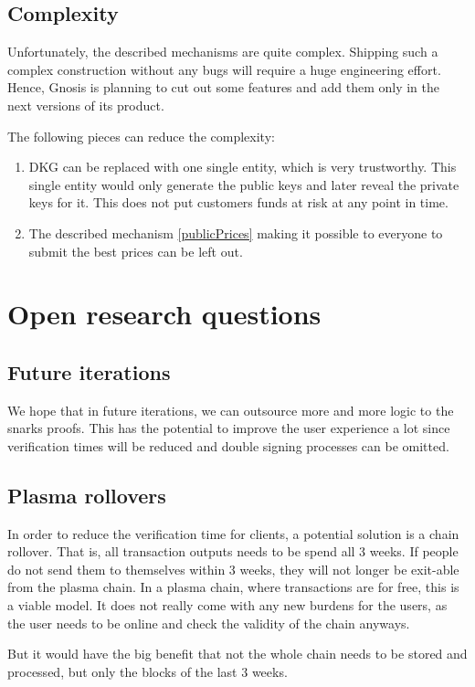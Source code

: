 \documentclass[11pt,parskip=full]{scrartcl}%
\begin{document}
\subsection{Complexity}
Unfortunately, the described mechanisms are quite complex. 
Shipping such a complex construction without any bugs will require a huge engineering effort. 
Hence, Gnosis is planning to cut out some features and add them only in the next versions of its product. 

The following pieces can reduce the complexity:
\begin{enumerate}
\item
DKG can be replaced with one single entity, which is very trustworthy. 
This single entity would only generate the public keys and later reveal the private keys for it. 
This does not put customers funds at risk at any point in time. 
\item
The described mechanism \ref{publicPrices} making it possible to everyone to submit the best prices can be left out. 
\end{enumerate}

\section{Open research questions}

\subsection{Future iterations}
We hope that in future iterations, we can outsource more and more logic to the snarks proofs. 
This has the potential to improve the user experience a lot since verification times will be reduced and double signing processes can be omitted. 

\subsection{Plasma rollovers}
In order to reduce the verification time for clients, a potential solution is a chain rollover. 
That is, all transaction outputs needs to be spend all 3 weeks. 
If people do not send them to themselves within 3 weeks, they will not longer be exit-able from the plasma chain. 
In a plasma chain, where transactions are for free, this is a viable model. 
It does not really come with any new burdens for the users, as the user needs to be online and check the validity of the chain anyways.

But it would have the big benefit that not the whole chain needs to be stored and processed, but only the blocks of the last 3 weeks. 
\end{document}
